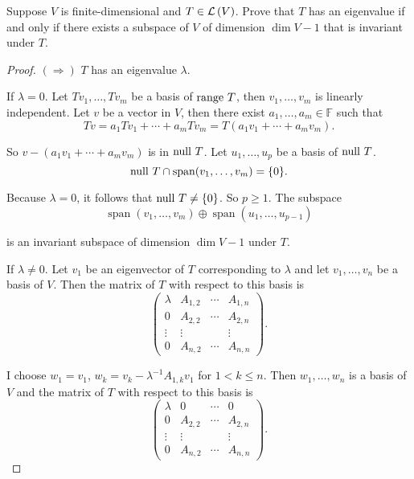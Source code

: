 \begin{exercise}
    Suppose $V$ is finite-dimensional and $T \in \mathcal{L}\left({V}\right)$. Prove that $T$ has an eigenvalue if and only if there exists a subspace of $V$ of dimension $\dim V - 1$ that is invariant under $T$.
\end{exercise}

\begin{proof}
    $(\Rightarrow)$ $T$ has an eigenvalue $\lambda$.

    If $\lambda  = 0$. Let $Tv_{1}, \ldots, Tv_{m}$ be a basis of $\operatorname{range}\,{T}$, then $v_{1}, \ldots, v_{m}$ is linearly independent. Let $v$ be a vector in $V$, then there exist $a_{1}, \ldots, a_{m}\in\mathbb{F}$ such that
    \[
        Tv = a_{1}Tv_{1} + \cdots + a_{m}Tv_{m} = T(a_{1}v_{1} + \cdots + a_{m}v_{m}).
    \]

    So $v - (a_{1}v_{1} + \cdots + a_{m}v_{m})$ is in $\operatorname{null}\,{T}$. Let $u_{1}, \ldots, u_{p}$ be a basis of $\operatorname{null}\,{T}$.
    \[
        \operatorname{null}\,{T}\cap\operatorname{span}(v_{1}, \ldots, v_{m}) = \{ 0 \}.
    \]

    Because $\lambda = 0$, it follows that $\operatorname{null}\,{T}\ne \{ 0 \}$. So $p\geq 1$. The subspace
    \[
        \operatorname{span}(v_{1}, \ldots, v_{m})\oplus\operatorname{span}(u_{1}, \ldots, u_{p-1})
    \]

    is an invariant subspace of dimension $\dim V - 1$ under $T$.

    If $\lambda\ne 0$. Let $v_{1}$ be an eigenvector of $T$ corresponding to $\lambda$ and let $v_{1}, \ldots, v_{n}$ be a basis of $V$. Then the matrix of $T$ with respect to this basis is
    \[
        \begin{pmatrix}
            \lambda & A_{1,2} & \cdots & A_{1,n} \\
            0       & A_{2,2} & \cdots & A_{2,n} \\
            \vdots  & \vdots  &        & \vdots  \\
            0       & A_{n,2} & \cdots & A_{n,n}
        \end{pmatrix}.
    \]

    I choose $w_{1} = v_{1}$, $w_{k} = v_{k} - \lambda^{-1}A_{1,k}v_{1}$ for $1 < k\leq n$. Then $w_{1}, \ldots, w_{n}$ is a basis of $V$ and the matrix of $T$ with respect to this basis is
    \[
        \begin{pmatrix}
            \lambda & 0       & \cdots & 0       \\
            0       & A_{2,2} & \cdots & A_{2,n} \\
            \vdots  & \vdots  &        & \vdots  \\
            0       & A_{n,2} & \cdots & A_{n,n}
        \end{pmatrix}.
    \]


\end{proof}

